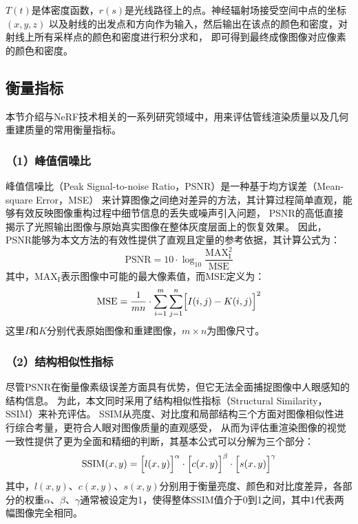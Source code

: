$T\left(t\right)$是体密度函数，$r\left(s\right)$是光线路径上的点。神经辐射场接受空间中点的坐标$\left(x,y,z\right)$
以及射线的出发点和方向作为输入，然后输出在该点的颜色和密度，对射线上所有采样点的颜色和密度进行积分求和，
即可得到最终成像图像对应像素的颜色和密度。

\subsection{衡量指标}

本节介绍与NeRF技术相关的一系列研究领域中，用来评估管线渲染质量以及几何重建质量的常用衡量指标。

\subsubsection*{（1）峰值信噪比} 

峰值信噪比（Peak Signal-to-noise Ratio，PSNR）是一种基于均方误差（Mean-square Error，MSE）
来计算图像之间绝对差异的方法，其计算过程简单直观，能够有效反映图像重构过程中细节信息的丢失或噪声引入问题，
PSNR的高低直接揭示了光照输出图像与原始真实图像在整体灰度层面上的恢复效果。
因此，PSNR能够为本文方法的有效性提供了直观且定量的参考依据，其计算公式为：
\begin{equation}\label{eq:PSNR}
\mathrm{PSNR}=10\cdot\log_{10}\frac{\mathrm{MAX}_\mathrm{I}^2}{\mathrm{MSE}}
\end{equation}
其中，$\mathrm{MAX}_\mathrm{I}$表示图像中可能的最大像素值，而$\mathrm{MSE}$定义为：
\begin{equation}\label{eq:MSE}
\mathrm{MSE}=\frac{1}{mn}\cdot\sum_{i=1}^{m}\sum_{j=1}^{n}\Bigl[I(i,j)-K(i,j)\Bigr]^2
\end{equation}
这里$I$和$K$分别代表原始图像和重建图像，$m\times n$为图像尺寸。

\subsubsection*{（2）结构相似性指标} 

尽管PSNR在衡量像素级误差方面具有优势，但它无法全面捕捉图像中人眼感知的结构信息。
为此，本文同时采用了结构相似性指标（Structural Similarity，SSIM）来补充评估。
SSIM从亮度、对比度和局部结构三个方面对图像相似性进行综合考量，更符合人眼对图像质量的直观感受，
从而为评估重渲染图像的视觉一致性提供了更为全面和精细的判断，其基本公式可以分解为三个部分：
\begin{equation}\label{eq:SSIM}
\mathrm{SSIM}(x,y)=\Bigl[l(x,y)\Bigr]^\alpha\cdot\Bigl[c(x,y)\Bigr]^\beta\cdot\Bigl[s(x,y)\Bigr]^\gamma
\end{equation}
其中，$l(x,y)$、$c(x,y)$、$s(x,y)$分别用于衡量亮度、颜色和对比度差异，各部分的权重$\alpha$、$\beta$、$\gamma$通常被设定为1，使得整体SSIM值介于0到1之间，其中1代表两幅图像完全相同。

